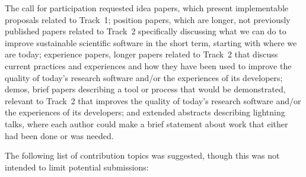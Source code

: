 \documentclass[11pt, oneside]{amsart}
\begin{document}
The call for participation requested
idea papers, which present implementable proposals related to Track~1;
position papers, which are longer, not previously published papers related to
Track~2 specifically discussing what we can do to improve sustainable scientific
software in the short term, starting with where we are today;
experience papers, longer papers related to Track~2 that discuss current
practices and experiences and how they have been used to improve the quality of
today's research software and/or the experiences of its developers;
demos, brief papers describing a tool or
process that would be demonstrated, relevant to Track~2 that improves the quality of today's research
software and\slash or the experiences of its developers; and
extended abstracts describing lightning talks,
where each author could make a brief statement about work that either had been
done or was needed.

The following list of contribution topics was suggested, though this was not intended to limit potential submissions:
\end{document}
